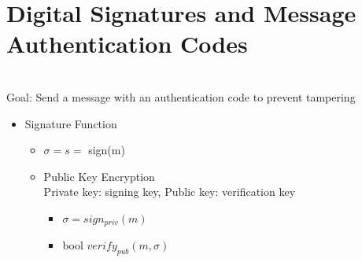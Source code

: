 \section{Digital Signatures and Message Authentication Codes}
\\Goal: Send a message with an authentication code to prevent tampering
\begin{itemize}
\item Signature Function
    \begin{itemize}
    \item $\sigma = s =$ sign(m)
    \item Public Key Encryption
    \\ Private key: signing key, Public key: verification key
        \begin{itemize}
        \item $\sigma = sign_{priv}(m)$
        \item bool $verify_{pub}(m, \sigma)$
        \end{itemize}
    \end{itemize}
\end{itemize}